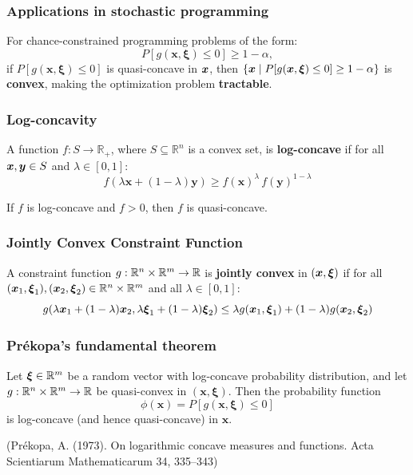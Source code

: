 \documentclass{beamer}
\begin{document}
\begin{frame}
\frametitle{Applications in stochastic programming}

For chance-constrained programming problems of the form:
\[
P[g(\mathbf{x},\boldsymbol{\xi}) \leq 0] \geq 1-\alpha,
\]
if $P[g(\mathbf{x},\boldsymbol{\xi})\leq 0]$ is quasi-concave in ${\boldsymbol{x}}$, 
then $\{ {\boldsymbol{x}} \mid P[g({\boldsymbol{x}},\boldsymbol{\xi}) \leq 0] \geq 1-\alpha\}$ is \textbf{convex}, making the optimization problem \textbf{tractable}.

\end{frame}

\begin{frame}
\frametitle{Log-concavity}

\begin{definition}
	A function $f: S \to \mathbb{R}_+$, where $S \subseteq \mathbb{R}^n$ is a convex set, is \textbf{log-concave} if for all ${\boldsymbol{x}}, {\boldsymbol{y}} \in S$ and $\lambda \in [0,1]$:
	\[
	f(\lambda \mathbf{x} + (1-\lambda)\mathbf{y}) \geq f(\mathbf{x})^\lambda \, f(\mathbf{y})^{1-\lambda}
	\]
\end{definition}

\begin{theorem}
	If $f$ is log-concave and $f > 0$, then $f$ is quasi-concave.
\end{theorem}

\end{frame}

\begin{frame}
	\frametitle{Jointly Convex Constraint Function}

\begin{definition}
	A constraint function $g: {\mathbb{R}}^n \times {\mathbb{R}}^m \to {\mathbb{R}}$ is \textbf{jointly convex} in $({\boldsymbol{x}}, {\boldsymbol{\xi}})$ if for all $({\boldsymbol{x}}_1, {\boldsymbol{\xi}}_1), ({\boldsymbol{x}}_2, {\boldsymbol{\xi}}_2) \in {\mathbb{R}}^n \times {\mathbb{R}}^m$ and all $\lambda \in [0,1]$:
	\[
	g(\lambda {\boldsymbol{x}}_1 + (1-\lambda){\boldsymbol{x}}_2, \lambda {\boldsymbol{\xi}}_1 + (1-\lambda){\boldsymbol{\xi}}_2) \leq \lambda g({\boldsymbol{x}}_1, {\boldsymbol{\xi}}_1) + (1-\lambda) g({\boldsymbol{x}}_2, {\boldsymbol{\xi}}_2)
	\]
\end{definition}

\end{frame}

\begin{frame}
\frametitle{Prékopa's fundamental theorem}

\begin{theorem}
Let ${\boldsymbol{\xi}} \in {\mathbb{R}}^m$ be a random vector with log-concave probability distribution, and let $g: {\mathbb{R}}^n \times \mathbb{R}^m \to \mathbb{R}$ be quasi-convex in $(\mathbf{x}, \boldsymbol{\xi})$. Then the probability function
\[
	\phi(\mathbf{x}) = P[ g(\mathbf{x}, \boldsymbol{\xi}) \leq 0 ]
\]
is log-concave (and hence quasi-concave) in $\mathbf{x}$.
\end{theorem}

\mbox{}

(Prékopa, A. (1973). On logarithmic concave measures and functions.
Acta Scientiarum Mathematicarum 34, 335--343)
\end{frame}
\end{document}
